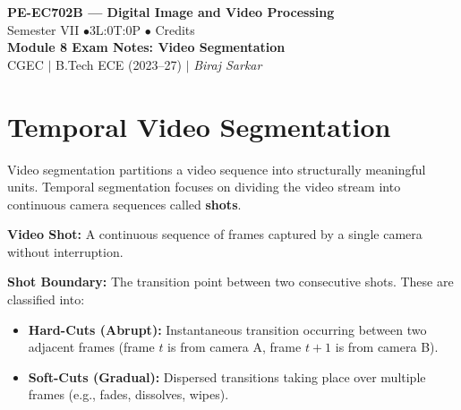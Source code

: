 \documentclass[12pt,a4paper]{article}
\begin{document}

\begin{center}
  {\LARGE\bfseries\color{myred} PE-EC702B --- Digital Image and Video Processing}\\[5pt]
  {\normalsize\color{mydark} Semester VII \quad$\bullet$\quad 3L:0T:0P \quad$\bullet$ Credits}\\[3pt]
  {\normalsize\color{myteal}\textbf{Module 8 Exam Notes: Video Segmentation}}\\[3pt]
  {\small\color{mydark} CGEC \;$|$\; B.Tech ECE (2023--27) \;$|$\; \textit{Biraj Sarkar}}
\end{center}
\vspace{2pt}
\noindent{\color{myred}\rule{\linewidth}{1.5pt}}
\vspace{2pt}

\hypersetup{linkcolor=mydark}
\tableofcontents
\hypersetup{linkcolor=myteal}
\newpage

\section{Temporal Video Segmentation}

Video segmentation partitions a video sequence into structurally meaningful units. Temporal segmentation focuses on dividing the video stream into continuous camera sequences called \textbf{shots}.

\begin{tcolorbox}[defbox, title={Video Shot Definitions}]
\textbf{Video Shot:} A continuous sequence of frames captured by a single camera without interruption.
\par\noindent
\textbf{Shot Boundary:} The transition point between two consecutive shots. These are classified into:
\begin{itemize}[leftmargin=*, itemsep=1.5pt]
  \item \textbf{Hard-Cuts (Abrupt):} Instantaneous transition occurring between two adjacent frames (frame $t$ is from camera A, frame $t+1$ is from camera B).
  \item \textbf{Soft-Cuts (Gradual):} Dispersed transitions taking place over multiple frames (e.g., fades, dissolves, wipes).
\end{itemize}
\end{tcolorbox}
\end{document}
